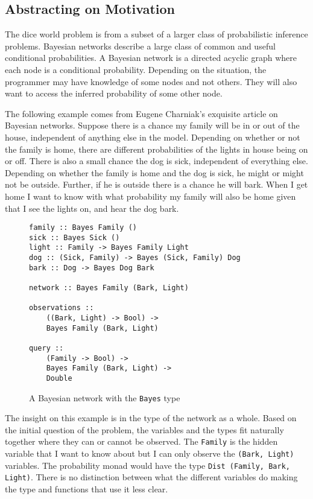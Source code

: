 \documentclass[9pt,twocolumn]{article}
\begin{document}
\subsection{Abstracting on Motivation}
The dice world problem is from a subset of a larger class of probabilistic inference problems. Bayesian networks describe a large class of common and useful conditional probabilities. A Bayesian network is a directed acyclic graph where each node is a conditional probability. Depending on the situation, the programmer may have knowledge of some nodes and not others. They will also want to access the inferred probability of some other node.

The following example comes from Eugene Charniak's exquisite article on Bayesian networks. Suppose there is a chance my family will be in or out of the house, independent of anything else in the model. Depending on whether or not the family is home, there are different probabilities of the lights in house being on or off. There is also a small chance the dog is sick, independent of everything else. Depending on whether the family is home and the dog is sick, he might or might not be outside. Further, if he is outside there is a chance he will bark. When I get home I want to know with what probability my family will also be home given that I see the lights on, and hear the dog bark.

\begin{figure}[H]
\begin{verbatim}
family :: Bayes Family ()
sick :: Bayes Sick ()
light :: Family -> Bayes Family Light
dog :: (Sick, Family) -> Bayes (Sick, Family) Dog
bark :: Dog -> Bayes Dog Bark

network :: Bayes Family (Bark, Light)

observations ::
    ((Bark, Light) -> Bool) ->
    Bayes Family (Bark, Light)

query ::
    (Family -> Bool) ->
    Bayes Family (Bark, Light) ->
    Double
\end{verbatim}
\caption{A Bayesian network with the \texttt{Bayes} type}
\end{figure}

The insight on this example is in the type of the network as a whole. Based on the initial question of the problem, the variables and the types fit naturally together where they can or cannot be observed. The \texttt{Family} is the hidden variable that I want to know about but I can only observe the \texttt{(Bark, Light)} variables. The probability monad would have the type \texttt{Dist (Family, Bark, Light)}. There is no distinction between what the different variables do making the type and functions that use it less clear.
\end{document}

